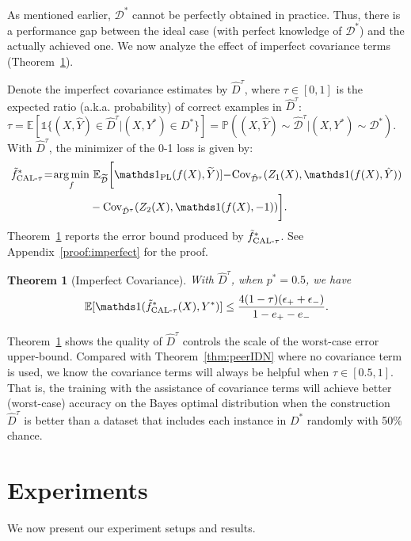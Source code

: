 \documentclass[final]{cvpr}
\DeclareMathOperator*{\argmin}{arg\,min}
\newcommand{\estDg}{{\hat D^{\tau}}}
\newcommand{\estDisg}{{\hat {\mathcal D}^{\tau}}}
\newcommand{\PP}{\mathbb P}
\newcommand{\BR}{\mathds 1}
\newcommand{\E}{\mathbb E}
\newtheorem{theorem}{Theorem}
\newcommand{\covpeer}{\text{CAL}}
\begin{document}
As mentioned earlier, $\mathcal{D}^*$ cannot be perfectly obtained in practice. Thus, there is a performance gap between the ideal case (with perfect knowledge of $\mathcal D^*$) and the actually achieved one.
We now analyze the effect of imperfect covariance terms (Theorem~\ref{thm:imperfect}).

Denote the imperfect covariance estimates by $\estDg$, where $\tau\in[0,1]$ is the expected ratio (a.k.a. probability) of correct examples in $\estDg$:
$\tau = \E[\BR \{ (X,\hat Y) \in \estDg | (X,Y^*) \in D^* \}] =  \PP( (X,\hat Y)\sim \estDisg | (X,Y^*)\sim \mathcal D^* ).$
With $\estDg$, the minimizer of the 0-1 \covpeer{} loss is given by: 
{\small
\begin{align*}
    \tilde f^*_{\text{\covpeer{}-}\tau} \hspace{-2pt} = \hspace{-2pt}\argmin_{f}
& ~ \E_{\widetilde{\mathcal D}} \bigg[{\BR_{\text{PL}}}(f(X),\widetilde{Y})] \hspace{-2pt} - \hspace{-2pt} \text{Cov}_{\estDisg}(Z_1(X),\BR(f(X),\hat Y)) \\
& - \text{Cov}_{\estDisg}(Z_2(X),\BR(f(X),-1))\bigg].
\end{align*}}
Theorem~\ref{thm:imperfect} reports the error bound produced by $\tilde f^*_{\text{\covpeer{}-}\tau}$. See Appendix~\ref{proof:imperfect} for the proof.
\begin{theorem}[Imperfect Covariance]\label{thm:imperfect}
With $\estDg$, when $p^*=0.5$, we have
\[
\E[\BR(\tilde f^*_{\text{\covpeer{}-}\tau}(X),Y^*)] \leq \frac{4(1-\tau)(\epsilon_+ + \epsilon_-)}{1-e_+-e_-}.
\]
\end{theorem}

Theorem~\ref{thm:imperfect} shows the quality of $\estDg$ controls the scale of the worst-case error upper-bound.
Compared with Theorem~\ref{thm:peerIDN} where no covariance term is used, we know the covariance terms will always be helpful when $\tau \in [0.5,1]$. That is, the training with the assistance of covariance terms will achieve better (worst-case) accuracy on the Bayes optimal distribution when the construction $\estDg$ is better than a dataset that includes each instance in $D^*$ randomly with 50\% chance.



 \section{Experiments}
We now present our experiment setups and results. 
\end{document}
